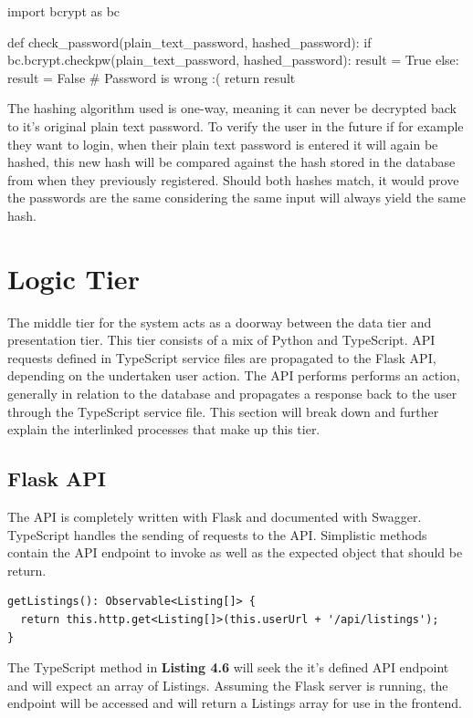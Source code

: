 \begin{python}[caption=Verifing a Password]
import bcrypt as bc

def check_password(plain_text_password, hashed_password):
    if bc.bcrypt.checkpw(plain_text_password, hashed_password):
        result = True
    else:
        result = False # Password is wrong :(
    return result
\end{python}

The hashing algorithm used is one-way, meaning it can never be decrypted back to it's original plain text password. To verify the user in the future if for example they want to login, when their plain text password is entered it will again be hashed, this new hash will be compared against the hash stored in the database from when they previously registered. Should both hashes match, it would prove the passwords are the same considering the same input will always yield the same hash.

\section{Logic Tier}
The middle tier for the system acts as a doorway between the data tier and presentation tier. This tier consists of a mix of Python and TypeScript. API requests defined in TypeScript service files are propagated to the Flask API, depending on the undertaken user action. The API performs performs an action, generally in relation to the database and propagates a response back to the user through the TypeScript service file. This section will break down and further explain the interlinked processes that make up this tier.

\subsection{Flask API}
The API is completely written with Flask and documented with Swagger. TypeScript handles the sending of requests to the API. Simplistic methods contain the API endpoint to invoke as well as the expected object that should be return.

\begin{lstlisting}[caption=Basic Request to the API]
getListings(): Observable<Listing[]> {
  return this.http.get<Listing[]>(this.userUrl + '/api/listings');
}
\end{lstlisting}

The TypeScript method in \textbf{Listing 4.6} will seek the it's defined API endpoint and will expect an array of Listings. Assuming the Flask server is running, the endpoint will be accessed and will return a Listings array for use in the frontend. \newline

